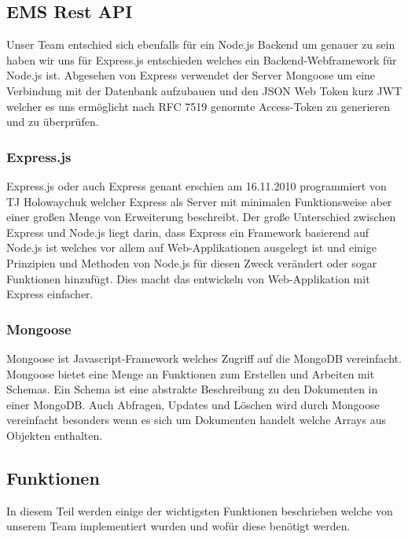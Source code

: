 		 \subsection{EMS Rest API}
		 	Unser Team entschied sich ebenfalls für ein Node.js Backend um genauer zu sein haben wir uns für Express.js entschieden welches ein Backend-Webframework für Node.js ist. Abgesehen von Express verwendet der Server Mongoose um eine Verbindung mit der Datenbank aufzubauen und den JSON Web Token kurz JWT welcher es uns ermöglicht nach RFC 7519 genormte Access-Token zu generieren und zu überprüfen. 
		 	
		 	\subsubsection{Express.js}
		 	 	Express.js oder auch Express genant erschien am 16.11.2010 programmiert von TJ Holowaychuk welcher Express als Server mit minimalen Funktionsweise aber einer großen Menge von Erweiterung beschreibt. Der große Unterschied zwischen Express und Node.js liegt darin, dass Express ein Framework basierend auf Node.js ist welches vor allem auf Web-Applikationen ausgelegt ist und einige Prinzipien und Methoden von Node.js für diesen Zweck verändert oder sogar Funktionen hinzufügt. Dies macht das entwickeln von Web-Applikation mit Express einfacher.
		 	
		 	\subsubsection{Mongoose}
		 		Mongoose ist Javascript-Framework welches Zugriff auf die MongoDB vereinfacht. Mongoose bietet eine Menge an Funktionen zum Erstellen und Arbeiten mit Schemas. Ein Schema ist eine abstrakte Beschreibung zu den Dokumenten in einer MongoDB. Auch Abfragen, Updates und Löschen wird durch Mongoose vereinfacht besonders wenn es sich um Dokumenten handelt welche Arrays aus Objekten enthalten. 
		 	
		\subsection{Funktionen}
		 	In diesem Teil werden einige der wichtigsten Funktionen beschrieben welche von unserem Team implementiert wurden und wofür diese benötigt werden. 
		 	
